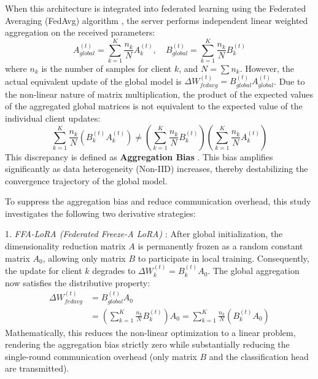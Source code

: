 \documentclass[journal]{IEEEtran}
\begin{document}
When this architecture is integrated into federated learning using the Federated Averaging (FedAvg) algorithm \cite{mcmahan2017communication}, the server performs independent linear weighted aggregation on the received parameters:
\begin{equation}
A_{global}^{(t)} = \sum_{k=1}^{K} \frac{n_k}{N} A_k^{(t)}, \quad B_{global}^{(t)} = \sum_{k=1}^{K} \frac{n_k}{N} B_k^{(t)}
\end{equation}
where $n_k$ is the number of samples for client $k$, and $N = \sum n_k$. However, the actual equivalent update of the global model is $\Delta W_{fedavg}^{(t)} = B_{global}^{(t)} A_{global}^{(t)}$. Due to the non-linear nature of matrix multiplication, the product of the expected values of the aggregated global matrices is not equivalent to the expected value of the individual client updates:
\begin{equation}
\sum_{k=1}^{K} \frac{n_k}{N} (B_k^{(t)} A_k^{(t)}) \neq \left( \sum_{k=1}^{K} \frac{n_k}{N} B_k^{(t)} \right) \left( \sum_{k=1}^{K} \frac{n_k}{N} A_k^{(t)} \right)
\end{equation}
This discrepancy is defined as \textbf{{A}ggregation {B}ias} \cite{ffa_lora_paper}. This bias amplifies significantly as data heterogeneity (Non-IID) increases, thereby destabilizing the convergence trajectory of the global model.

To suppress the aggregation bias and reduce communication overhead, this study investigates the following two derivative strategies:

1. \textit{FFA-LoRA (Federated Freeze-A LoRA)} \cite{ffa_lora_paper}: After global initialization, the dimensionality reduction matrix $A$ is permanently frozen as a random constant matrix $A_0$, allowing only matrix $B$ to participate in local training. Consequently, the update for client $k$ degrades to $\Delta W_k^{(t)} = B_k^{(t)} A_0$. The global aggregation now satisfies the distributive property:
\begin{equation}
\begin{aligned}
\Delta W_{fedavg}^{(t)} &= B_{global}^{(t)} A_0 \\
&= \left( \sum_{k=1}^{K} \frac{n_k}{N} B_k^{(t)} \right) A_0 = \sum_{k=1}^{K} \frac{n_k}{N} (B_k^{(t)} A_0)
\end{aligned}
\end{equation}
Mathematically, this reduces the non-linear optimization to a linear problem, rendering the aggregation bias strictly zero while substantially reducing the single-round communication overhead (only matrix $B$ and the classification head are transmitted).
\end{document}
